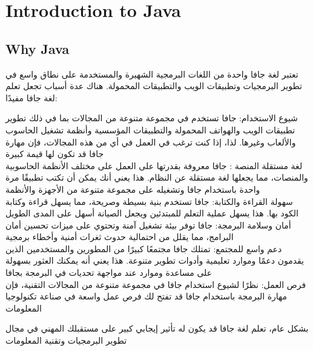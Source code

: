   \chapter{Introduction to Java}
  \thispagestyle{empty}
  \section{Why Java}
  \begin{AR}
    تعتبر لغة جافا واحدة من اللغات البرمجية الشهيرة والمستخدمة على نطاق واسع في تطوير البرمجيات وتطبيقات الويب والتطبيقات المحمولة. هناك عدة أسباب تجعل تعلم لغة جافا مفيدًا:
    
    \LR{\textcolor{theme}{- 1}} شيوع الاستخدام: جافا تستخدم في مجموعة متنوعة من المجالات بما في ذلك تطوير تطبيقات الويب والهواتف المحمولة والتطبيقات المؤسسية وأنظمة تشغيل الحاسوب والألعاب وغيرها. لذا، إذا كنت ترغب في العمل في أي من هذه المجالات، فإن مهارة جافا قد تكون لها قيمة كبيرة
\\    
    \LR{\textcolor{theme}{- 2}} لغة مستقلة المنصة : جافا معروفة بقدرتها على العمل على مختلف الأنظمة الحاسوبية والمنصات، مما يجعلها لغة مستقلة عن النظام. هذا يعني أنك يمكن أن تكتب تطبيقًا مرة واحدة باستخدام جافا وتشغيله على مجموعة متنوعة من الأجهزة والأنظمة 
\\
    \LR{\textcolor{theme}{- 3}} سهولة القراءة والكتابة: جافا تستخدم بنية بسيطة وصريحة، مما يسهل قراءة وكتابة الكود بها. هذا يسهل عملية التعلم للمبتدئين ويجعل الصيانة أسهل على المدى الطويل
\\
    \LR{\textcolor{theme}{- 4}} أمان وسلامة البرمجة: جافا توفر بيئة تشغيل آمنة وتحتوي على ميزات تحسين أمان البرامج، مما يقلل من احتمالية حدوث ثغرات أمنية وأخطاء برمجية
\\
    \LR{\textcolor{theme}{- 5}} دعم واسع للمجتمع: تمتلك جافا مجتمعًا كبيرًا من المطورين والمستخدمين الذين يقدمون دعمًا وموارد تعليمية وأدوات تطوير متنوعة. هذا يعني أنه يمكنك العثور بسهولة على مساعدة وموارد عند مواجهة تحديات في البرمجة بجافا
\\
    \LR{\textcolor{theme}{- 6}} فرص العمل: نظرًا لشيوع استخدام جافا في مجموعة متنوعة من المجالات التقنية، فإن مهارة البرمجة باستخدام جافا قد تفتح لك فرص عمل واسعة في صناعة تكنولوجيا المعلومات

    بشكل عام، تعلم لغة جافا قد يكون له تأثير إيجابي كبير على مستقبلك المهني في مجال تطوير البرمجيات وتقنية المعلومات
  \end{AR}
  \newpage
